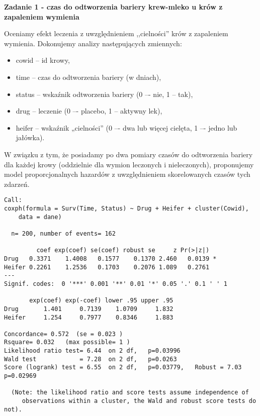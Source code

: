 \documentclass[]{article}
\title{}
\author{}
\date{}
\begin{document}
\maketitle


\thispagestyle{fancy}
\textbf{Zadanie 1 - czas do odtworzenia bariery krew-mleko u krów z zapaleniem wymienia}

Oceniamy efekt leczenia z uwzględnieniem ,,cielności'' krów z zapaleniem
wymienia. Dokonujemy analizy następujących zmiennych:

\begin{itemize}
\item cowid -- id krowy,
\item time -- czas do odtworzenia bariery (w dniach),
\item status -- wskaźnik odtworzenia bariery (0 –- nie, 1 -- tak),
\item drug -- leczenie (0 –- placebo, 1 -- aktywny lek),
\item heifer -- wskaźnik „cielności” (0 –- dwa lub więcej cielęta, 1 –- jedno lub
jałówka).
\end{itemize}

W związku z tym, że posiadamy po dwa pomiary czasów do odtworzenia
bariery dla każdej krowy (oddzielnie dla wymion leczonych i
nieleczonych), proponujemy model proporcjonalnych hazardów z
uwzględnieniem skorelowanych czasów tych zdarzeń.

\begin{verbatim}
Call:
coxph(formula = Surv(Time, Status) ~ Drug + Heifer + cluster(Cowid), 
    data = dane)

  n= 200, number of events= 162 

         coef exp(coef) se(coef) robust se     z Pr(>|z|)  
Drug   0.3371    1.4008   0.1577    0.1370 2.460   0.0139 *
Heifer 0.2261    1.2536   0.1703    0.2076 1.089   0.2761  
---
Signif. codes:  0 '***' 0.001 '**' 0.01 '*' 0.05 '.' 0.1 ' ' 1

       exp(coef) exp(-coef) lower .95 upper .95
Drug       1.401     0.7139    1.0709     1.832
Heifer     1.254     0.7977    0.8346     1.883

Concordance= 0.572  (se = 0.023 )
Rsquare= 0.032   (max possible= 1 )
Likelihood ratio test= 6.44  on 2 df,   p=0.03996
Wald test            = 7.28  on 2 df,   p=0.0263
Score (logrank) test = 6.55  on 2 df,   p=0.03779,   Robust = 7.03  p=0.02969

  (Note: the likelihood ratio and score tests assume independence of
     observations within a cluster, the Wald and robust score tests do not).
\end{verbatim}
\end{document}
